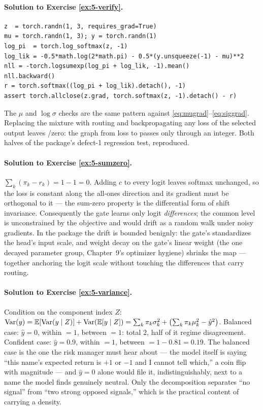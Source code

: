\paragraph{Solution to Exercise \ref{ex:5-verify}.}
\begin{lstlisting}
z  = torch.randn(1, 3, requires_grad=True)
mu = torch.randn(1, 3); y = torch.randn(1)
log_pi  = torch.log_softmax(z, -1)
log_lik = -0.5*math.log(2*math.pi) - 0.5*(y.unsqueeze(-1) - mu)**2
nll = -torch.logsumexp(log_pi + log_lik, -1).mean()
nll.backward()
r = torch.softmax((log_pi + log_lik).detach(), -1)
assert torch.allclose(z.grad, torch.softmax(z, -1).detach() - r)
\end{lstlisting}
The $\mu$ and $\log\sigma$ checks are the same pattern against
\eqref{eq:mugrad}--\eqref{eq:siggrad}. Replacing the mixture with
routing and backpropagating any loss of the selected output leaves
 /zero: the graph from loss to  passes
only through an integer. Both halves of the package's defect-1
regression test, reproduced.

\paragraph{Solution to Exercise \ref{ex:5-sumzero}.}
$\sum_k (\pi_k - r_k) = 1 - 1 = 0$. Adding $c$ to every logit leaves
softmax unchanged, so the loss is constant along the all-ones direction
and its gradient must be orthogonal to it --- the sum-zero property is
the differential form of shift invariance. Consequently the gate learns
only logit \emph{differences}; the common level is unconstrained by the
objective and would drift as a random walk under noisy gradients. In
the package the drift is bounded benignly: the gate's
 standardizes the head's input scale, and weight decay
on the gate's linear weight (the one decayed parameter group,
Chapter~9's optimizer hygiene) shrinks the map --- together anchoring
the logit scale without touching the differences that carry routing.

\paragraph{Solution to Exercise \ref{ex:5-variance}.}
Condition on the component index $Z$: $\operatorname{Var}(y) = \mathbb{E}[\operatorname{Var}(y \mid Z)] +
\operatorname{Var}(\mathbb{E}[y \mid Z]) = \sum_k \pi_k \sigma_k^2 + \bigl(\sum_k \pi_k
\mu_k^2 - \hat y^2\bigr)$. Balanced case: $\hat y = 0$, within $= 1$,
between $= 1$: total $2$, half of it regime disagreement. Confident
case: $\hat y = 0.9$, within $= 1$, between $= 1 - 0.81 = 0.19$. The
balanced case is the one the risk manager must hear about --- the model
itself is saying ``this name's expected return is $+1$ or $-1$ and I
cannot tell which,'' a coin flip with magnitude --- and $\hat y = 0$
alone would file it, indistinguishably, next to a name the model finds
genuinely neutral. Only the decomposition separates ``no signal'' from
``two strong opposed signals,'' which is the practical content of
carrying a density.

